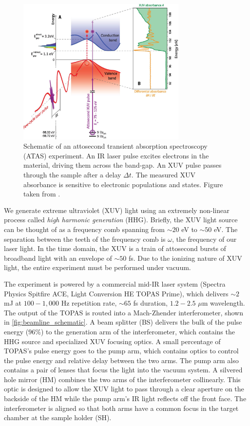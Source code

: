 \begin{figure}
	\centering
	\includegraphics[width=0.75\textwidth]{figures/chap3/ATAS_Cartoon_Si_Leone.jpg}
	\caption{Schematic of an attosecond transient absorption spectroscopy (ATAS) experiment. An IR laser pulse excites electrons in the material, driving them across the band-gap. An XUV pulse passes through the sample after a delay $\Delta t$. The measured XUV absorbance is sensitive to electronic populations and states. Figure taken from \cite{schultzeAttosecondBandgapDynamics2014}.}
	\label{fig:ATAS_Cartoon_Si_Leone}
\end{figure}

We generate extreme ultraviolet (XUV) light using an extremely non-linear process called \textit{high harmonic generation} (HHG). Briefly, the XUV light source can be thought of as a frequency comb spanning from $\sim20$ eV to $\sim50$ eV. The separation between the teeth of the frequency comb is $\omega$, the frequency of our laser light. In the time domain, the XUV is a train of attosecond bursts of broadband light with an envelope of $\sim50$ fs. Due to the ionizing nature of XUV light, the entire experiment must be performed under vacuum.

The experiment is powered by a commercial mid-IR laser system (Spectra Physics Spitfire ACE, Light Conversion HE TOPAS Prime), which delivers $\sim2$ mJ at $100 - 1,000$ Hz repetition rate, $\sim65$ fs duration, $1.2 - 2.5$ $\mu$m wavelength. The output of the TOPAS is routed into a Mach-Zhender interferometer, shown in \cref{fig:beamline_schematic}. A beam splitter (BS) delivers the bulk of the pulse energy ($96\%$) to the generation arm of the interferometer, which contains the HHG source and specialized XUV focusing optics. A small percentage of TOPAS's pulse energy goes to the pump arm, which contains optics to control the pulse energy and relative delay between the two arms. The pump arm also contains a pair of lenses that focus the light into the vacuum system. A silvered hole mirror (HM) combines the two arms of the interferometer collinearly. This optic is designed to allow the XUV light to pass through a clear aperture on the backside of the HM while the pump arm's IR light reflects off the front face. The interferometer is aligned so that both arms have a common focus in the target chamber at the sample holder (SH).

